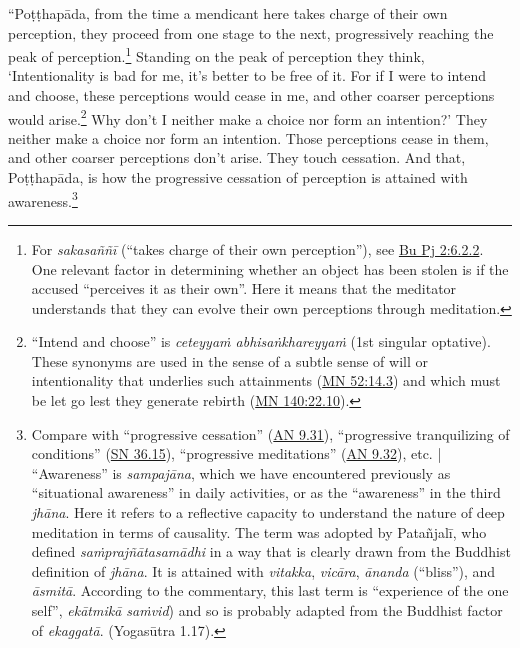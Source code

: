 \documentclass[12pt,openany]{book}%
\begin{document}
“\textsanskrit{Poṭṭhapāda}, from the time a mendicant here takes charge of their own perception, they proceed from one stage to the next, progressively reaching the peak of perception.\footnote{For \textit{\textsanskrit{sakasaññī}} (“takes charge of their own perception”), see \href{https://suttacentral.net/pli-tv-bu-vb-pj2/en/sujato\#6.2.2}{Bu Pj 2:6.2.2}. One relevant factor in determining whether an object has been stolen is if the accused “perceives it as their own”. Here it means that the meditator understands that they can evolve their own perceptions through meditation. } Standing on the peak of perception they think, ‘Intentionality is bad for me, it’s better to be free of it. For if I were to intend and choose, these perceptions would cease in me, and other coarser perceptions would arise.\footnote{“Intend and choose” is \textit{\textsanskrit{ceteyyaṁ} \textsanskrit{abhisaṅkhareyyaṁ}} (1st singular optative). These synonyms are used in the sense of a subtle sense of will or intentionality that underlies such attainments (\href{https://suttacentral.net/mn52/en/sujato\#14.3}{MN 52:14.3}) and which must be let go lest they generate rebirth (\href{https://suttacentral.net/mn140/en/sujato\#22.10}{MN 140:22.10}). } Why don’t I neither make a choice nor form an intention?’ They neither make a choice nor form an intention. Those perceptions cease in them, and other coarser perceptions don’t arise. They touch cessation. And that, \textsanskrit{Poṭṭhapāda}, is how the progressive cessation of perception is attained with awareness.\footnote{Compare with “progressive cessation” (\href{https://suttacentral.net/an9.31/en/sujato}{AN 9.31}), “progressive tranquilizing of conditions” (\href{https://suttacentral.net/sn36.15/en/sujato}{SN 36.15}), “progressive meditations” (\href{https://suttacentral.net/an9.32/en/sujato}{AN 9.32}), etc. | “Awareness” is \textit{\textsanskrit{sampajāna}}, which we have encountered previously as “situational awareness” in daily activities, or as the “awareness” in the third \textit{\textsanskrit{jhāna}}. Here it refers to a reflective capacity to understand the nature of deep meditation in terms of causality. The term was adopted by \textsanskrit{Patañjalī}, who defined \textit{\textsanskrit{saṁprajñātasamādhi}} in a way that is clearly drawn from the Buddhist definition of \textit{\textsanskrit{jhāna}}. It is attained with \textit{vitakka}, \textit{\textsanskrit{vicāra}}, \textit{\textsanskrit{ānanda}} (“bliss”), and \textit{\textsanskrit{āsmitā}}. According to the commentary, this last term is “experience of the one self”, \textit{\textsanskrit{ekātmikā} \textsanskrit{saṁvid}}) and so is probably adapted from the Buddhist factor of \textit{\textsanskrit{ekaggatā}}.  (\textsanskrit{Yogasūtra} 1.17). } 
\end{document}
